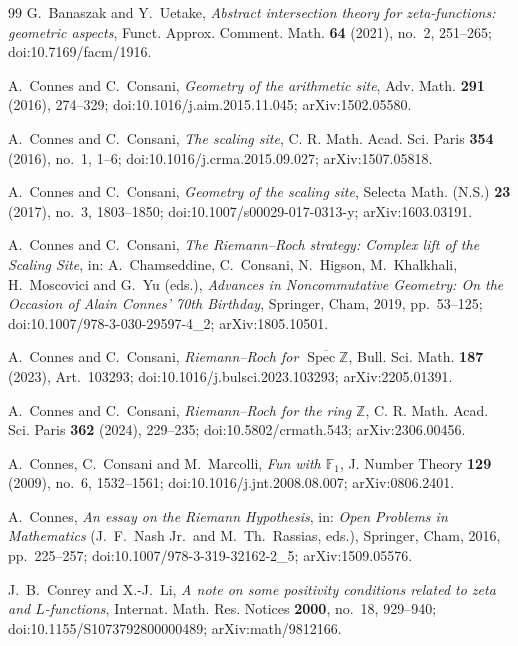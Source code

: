 \documentclass[11pt]{article}
\theoremstyle{plain}
\theoremstyle{definition}
\theoremstyle{remark}
\begin{document}
\begin{thebibliography}{99}
G.~Banaszak and Y.~Uetake,
\emph{Abstract intersection theory for zeta-functions: geometric aspects},
Funct. Approx. Comment. Math. \textbf{64} (2021), no.~2, 251--265;
doi:10.7169/facm/1916.

A.~Connes and C.~Consani,
\emph{Geometry of the arithmetic site},
Adv. Math. \textbf{291} (2016), 274--329;
doi:10.1016/j.aim.2015.11.045;
arXiv:1502.05580.

A.~Connes and C.~Consani,
\emph{The scaling site},
C. R. Math. Acad. Sci. Paris \textbf{354} (2016), no.~1, 1--6;
doi:10.1016/j.crma.2015.09.027;
arXiv:1507.05818.

A.~Connes and C.~Consani,
\emph{Geometry of the scaling site},
Selecta Math. (N.S.) \textbf{23} (2017), no.~3, 1803--1850;
doi:10.1007/s00029-017-0313-y;
arXiv:1603.03191.

A.~Connes and C.~Consani,
\emph{The Riemann--Roch strategy: Complex lift of the Scaling Site},
in: A.~Chamseddine, C.~Consani, N.~Higson, M.~Khalkhali, H.~Moscovici and G.~Yu
(eds.), \emph{Advances in Noncommutative Geometry: On the Occasion of Alain
Connes' 70th Birthday}, Springer, Cham, 2019, pp.~53--125;
doi:10.1007/978-3-030-29597-4\_2;
arXiv:1805.10501.

A.~Connes and C.~Consani,
\emph{Riemann--Roch for $\overline{\operatorname{Spec}\mathbb{Z}}$},
Bull. Sci. Math. \textbf{187} (2023), Art.\ 103293;
doi:10.1016/j.bulsci.2023.103293;
arXiv:2205.01391.

A.~Connes and C.~Consani,
\emph{Riemann--Roch for the ring $\mathbb{Z}$},
C. R. Math. Acad. Sci. Paris \textbf{362} (2024), 229--235;
doi:10.5802/crmath.543;
arXiv:2306.00456.

A.~Connes, C.~Consani and M.~Marcolli,
\emph{Fun with $\mathbb{F}_1$},
J. Number Theory \textbf{129} (2009), no.~6, 1532--1561;
doi:10.1016/j.jnt.2008.08.007;
arXiv:0806.2401.

A.~Connes,
\emph{An essay on the Riemann Hypothesis},
in: \emph{Open Problems in Mathematics} (J.~F.~Nash Jr.\ and M.~Th.~Rassias,
eds.), Springer, Cham, 2016, pp.~225--257;
doi:10.1007/978-3-319-32162-2\_5;
arXiv:1509.05576.

J.~B.~Conrey and X.-J.~Li,
\emph{A note on some positivity conditions related to zeta and $L$-functions},
Internat. Math. Res. Notices \textbf{2000}, no.~18, 929--940;
doi:10.1155/S1073792800000489;
arXiv:math/9812166.


\end{thebibliography}
\end{document}
